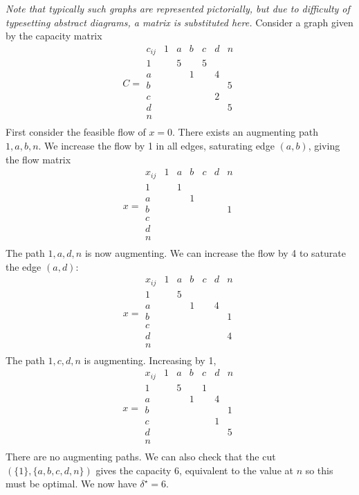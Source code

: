\begin{example}
    \textit{Note that typically such graphs are represented pictorially, but due to difficulty of typesetting abstract diagrams, a matrix is substituted here.}
    Consider a graph given by the capacity matrix
\[ C = \begin{array}{c|cccccc}
        c_{ij} & 1 & a & b & c & d & n \\\hline
        1 & & 5 & & 5 \\
        a & & & 1 & & 4 \\
        b & & & & & & 5\\
        c & & & & & 2\\
        d & & & & & & 5\\
        n \\
\end{array} \]
First consider the feasible flow of \( x = 0 \).
There exists an augmenting path \( 1, a, b, n \).
We increase the flow by 1 in all edges, saturating edge \( (a,b) \), giving the flow matrix
\[ x = \begin{array}{c|cccccc}
    x_{ij} & 1 & a & b & c & d & n \\\hline
    1 & & 1 & & & & \\
    a & & & 1 & & & \\
    b & & & & & & 1 \\
    c & & & & & & \\
    d & & & & & & \\
    n \\
\end{array} \]
The path \( 1, a, d, n \) is now augmenting.
We can increase the flow by 4 to saturate the edge \( (a,d) \):
\[ x = \begin{array}{c|cccccc}
    x_{ij} & 1 & a & b & c & d & n \\\hline
    1 & & 5 & & & & \\
    a & & & 1 & & 4 & \\
    b & & & & & & 1 \\
    c & & & & & & \\
    d & & & & & & 4 \\
    n \\
\end{array} \]
The path \( 1,c,d,n \) is augmenting.
Increasing by 1,
\[ x = \begin{array}{c|cccccc}
    x_{ij} & 1 & a & b & c & d & n \\\hline
    1 & & 5 & & 1 & & \\
    a & & & 1 & & 4 & \\
    b & & & & & & 1 \\
    c & & & & & 1 & \\
    d & & & & & & 5 \\
    n \\
\end{array} \]
There are no augmenting paths.
We can also check that the cut \( (\{ 1 \}, \{ a,b,c,d,n \}) \) gives the capacity 6, equivalent to the value at \( n \) so this must be optimal.
We now have \( \delta^\star = 6 \).
\end{example}

